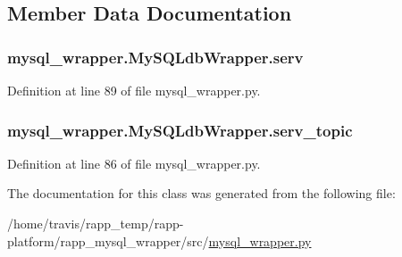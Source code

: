 \subsection{Member Data Documentation}
\hypertarget{classmysql__wrapper_1_1MySQLdbWrapper_ad3f471033029f6ca7487fa7e32ba533b}{
\subsubsection[{serv}]{\setlength{\rightskip}{0pt plus 5cm}mysql\-\_\-wrapper.\-My\-S\-Q\-Ldb\-Wrapper.\-serv}}\label{classmysql__wrapper_1_1MySQLdbWrapper_ad3f471033029f6ca7487fa7e32ba533b}


Definition at line 89 of file mysql\-\_\-wrapper.\-py.

\hypertarget{classmysql__wrapper_1_1MySQLdbWrapper_a63992807961399f3fbd3f963daad8cc1}{
\subsubsection[{serv\-\_\-topic}]{\setlength{\rightskip}{0pt plus 5cm}mysql\-\_\-wrapper.\-My\-S\-Q\-Ldb\-Wrapper.\-serv\-\_\-topic}}\label{classmysql__wrapper_1_1MySQLdbWrapper_a63992807961399f3fbd3f963daad8cc1}


Definition at line 86 of file mysql\-\_\-wrapper.\-py.



The documentation for this class was generated from the following file\-:\begin{DoxyCompactItemize}
\item 
/home/travis/rapp\-\_\-temp/rapp-\/platform/rapp\-\_\-mysql\-\_\-wrapper/src/\hyperlink{mysql__wrapper_8py}{mysql\-\_\-wrapper.\-py}\end{DoxyCompactItemize}
